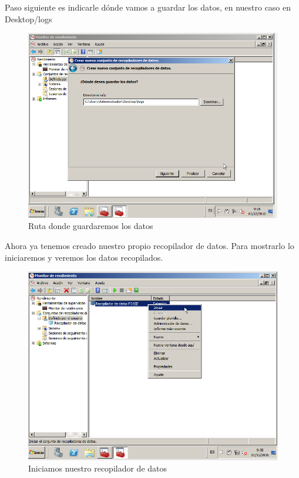 Paso siguiente es indicarle dónde vamos a guardar los datos, en nuestro caso en Desktop/logs

\begin{figure}[H] %
	\centering
	\includegraphics[scale=0.5]{imagenes/CD-6.png}  %
	\caption{Ruta donde guardaremos los datos}
\end{figure}

Ahora ya tenemos creado nuestro propio recopilador de datos. Para mostrarlo lo iniciaremos y veremos los datos recopilados.

\begin{figure}[H] %
	\centering
	\includegraphics[scale=0.5]{imagenes/CD-8.png}  %
	\caption{Iniciamos nuestro recopilador de datos}
\end{figure}


